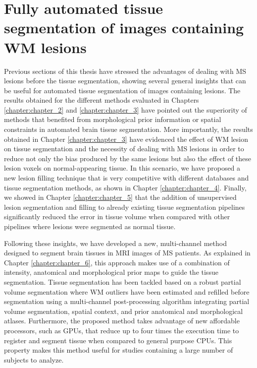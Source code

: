 \section{Fully automated tissue segmentation of images containing WM lesions}
\label{sec:label}

Previous sections of this thesis have stressed the advantages of dealing with MS lesions before the tissue segmentation, showing several general insights that can be useful for automated tissue segmentation of images containing lesions. The results obtained for the different methods evaluated in Chapters \ref{chapter:chapter_2} and \ref{chapter:chapter_3} have pointed out the superiority of methods that benefited from morphological prior information or spatial constraints in automated brain tissue segmentation. More importantly, the results obtained in Chapter \ref{chapter:chapter_3} have evidenced the effect of WM lesion on tissue segmentation and the necessity of dealing with MS lesions in order to reduce not only the bias produced by the same lesions but also the effect of these lesion voxels on normal-appearing tissue. In this scenario, we have proposed a new lesion filling technique that is very competitive with different databases and tissue segmentation methods, as shown in Chapter \ref{chapter:chapter_4}. Finally, we showed in Chapter \ref{chapter:chapter_5} that the addition of unsupervised lesion segmentation and filling to already existing tissue segmentation pipelines significantly reduced the error in tissue volume when compared with other pipelines where lesions were segmented as normal tissue. 

Following these insights, we have developed a new, multi-channel method designed to segment brain tissues in MRI images of MS patients. As explained in Chapter \ref{chapter:chapter_6}, this approach makes use of a combination of intensity, anatomical and morphological prior maps to guide the tissue segmentation. Tissue segmentation has been tackled based on a robust partial volume segmentation where WM outliers have been estimated and refilled before segmentation using a multi-channel post-processing algorithm integrating  partial volume segmentation, spatial context, and prior anatomical and morphological atlases. Furthermore, the proposed method takes advantage of new affordable processors, such as GPUs, that reduce up to four times the execution time to register and segment tissue when compared to general purpose CPUs. This property makes this method useful for studies containing a large number of subjects to analyze.   

